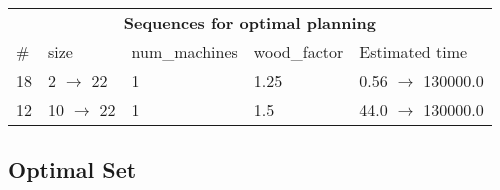 \documentclass{article}
\begin{document}
                            \begin{center}
                            \begin{tabular}{@{}l|l|l|l|l@{}}
                            \multicolumn{5}{c}{\bf \large Sequences for optimal planning}\\
                            \# & size & num\_machines & wood\_factor & Estimated time\\\midrule
                            18&2 $\rightarrow$ 22&1&1.25&0.56 $\rightarrow$ 130000.0\\
12&10 $\rightarrow$ 22&1&1.5&44.0 $\rightarrow$ 130000.0
                            \end{tabular}
                            \end{center}
                    
                                \subsection*{Optimal Set}
                                
\end{document}
